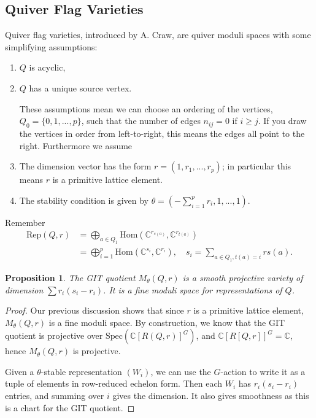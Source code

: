 \documentclass{article}
\newtheorem{prop}[theorem]{Proposition}
\theoremstyle{definition}
\theoremstyle{remark}
\numberwithin{theorem}{section}
\newcommand{\C}{\mathbb{C}}
\newcommand{\Spec}{\text{Spec}}
\newcommand{\Rep}{\mathrm{Rep}}
\newcommand{\Hom}{\text{Hom}}
\begin{document}
		\subsection{Quiver Flag Varieties}
		Quiver flag varieties, introduced by A. Craw, are quiver moduli spaces with some simplifying assumptions:
		\begin{enumerate}
			\item $Q$ is acyclic,
			\item $Q$ has a unique source vertex. \vspace{1em}
			
			These assumptions mean we can choose an ordering of the vertices, $Q_0 = \{0,1,...,p\}$, such that the number of edges $n_{ij} =0$ if $i\geq j$. If you draw the vertices in order from left-to-right, this means the edges all point to the right. Furthermore we assume
			\item The dimension vector has the form $r=(1,r_1,...,r_p)$; in particular this means $r$ is a primitive lattice element.
			\item The stability condition is given by $\theta = \left(-\sum_{i=1}^p r_i, 1,...,1\right).$
		\end{enumerate}
		Remember 
		\begin{align*}
			\Rep(Q,r) &= \bigoplus_{a\in Q_1}\Hom\left(\C^{r_{s(a)}}, \C^{r_{t(a)}}\right)\\
			&= \bigoplus_{i=1}^p \Hom(\C^{s_i}, \C^{r_i}), \quad s_i = \sum_{a\in Q_1, t(a)=i} r s(a).
		\end{align*}
		\begin{prop}
			The GIT quotient $M_\theta(Q,r)$ is a smooth projective variety of dimension $\sum r_i(s_i-r_i)$. It is a fine moduli space for representations of $Q$.
		\end{prop}
		\begin{proof}
			Our previous discussion shows that since $r$ is a primitive lattice element, $M_\theta(Q,r)$ is a fine moduli space. By construction, we know that the GIT quotient is projective over $\Spec(\C[R(Q,r)]^G)$, and $\C[R[Q,r]]^G=\C$, hence $M_\theta(Q,r)$ is projective. \vspace{1em}
			
			Given a $\theta$-stable representation $(W_i)$, we can use the $G$-action to write it as a tuple of elements in row-reduced echelon form. Then each $W_i$ has $r_i(s_i-r_i)$ entries, and summing over $i$ gives the dimension. It also gives smoothness as this is a chart for the GIT quotient.
		\end{proof}
	
\end{document}

